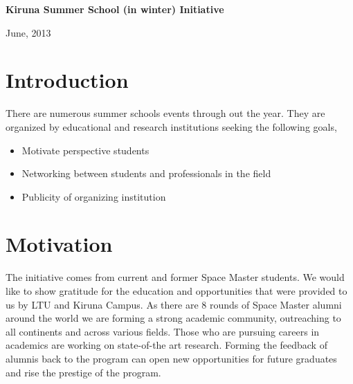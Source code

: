 \documentclass[a4paper,14pt]{article}
\title{}
\begin{document}
\thispagestyle{empty}
\begin{center}


\normalsize{\textbf{Kiruna Summer School (in winter) Initiative}}
\vspace{7cm}


\vspace {1cm}
June, 2013 \\
\end{center}

 

\newpage
\tableofcontents
\newpage
\vspace{7cm}
\section{Introduction}

There are numerous summer schools events through out the year. They are organized by educational and research institutions
seeking the following goals,
\begin{itemize}
\item Motivate perspective students
\item Networking between students and professionals in the field
\item Publicity of organizing institution
\end{itemize}

\section{Motivation}
The initiative comes from current and former Space Master students. We would like to show gratitude for the education and 
opportunities that were provided to us by LTU and Kiruna Campus. As there are 8 rounds of Space Master alumni
around the world we are forming a strong academic community, outreaching to all continents and across various
fields. Those who are pursuing careers in academics are working on state-of-the art research. Forming the feedback
of alumnis back to the program can open new opportunities for future graduates and rise the prestige of the program. 
\end{document}
